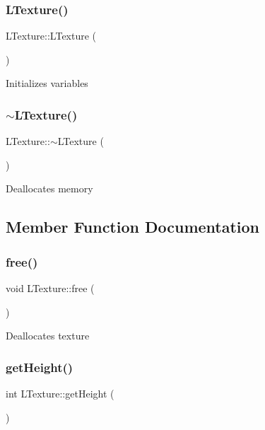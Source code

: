 \subsubsection{\texorpdfstring{L\+Texture()}{LTexture()}}
{\footnotesize\ttfamily L\+Texture\+::\+L\+Texture (\begin{DoxyParamCaption}{ }\end{DoxyParamCaption})}

Initializes variables \mbox{\label{class_l_texture_a49cfe57c36e58ad99c1ea73fc274b77b}} 
\subsubsection{\texorpdfstring{$\sim$\+L\+Texture()}{~LTexture()}}
{\footnotesize\ttfamily L\+Texture\+::$\sim$\+L\+Texture (\begin{DoxyParamCaption}{ }\end{DoxyParamCaption})}

Deallocates memory 

\subsection{Member Function Documentation}
\mbox{\label{class_l_texture_abef558f0b920270079925548a3976a06}} 
\subsubsection{\texorpdfstring{free()}{free()}}
{\footnotesize\ttfamily void L\+Texture\+::free (\begin{DoxyParamCaption}{ }\end{DoxyParamCaption})}

Deallocates texture \mbox{\label{class_l_texture_a277f45af3dae7e35ca846a527039e59a}} 
\subsubsection{\texorpdfstring{get\+Height()}{getHeight()}}
{\footnotesize\ttfamily int L\+Texture\+::get\+Height (\begin{DoxyParamCaption}{ }\end{DoxyParamCaption})}

